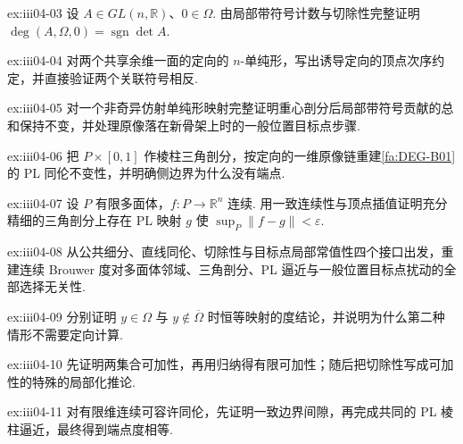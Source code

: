 \begin{FAExercise}[仿射度]{ex:iii04-03}
设 \(\displaystyle A\in GL(n,\mathbb R)\)、\(\displaystyle0\in\Omega\). 由局部带符号计数与切除性完整证明 \(\displaystyle\deg(A,\Omega,0)=\operatorname{sgn}\det A\).
\end{FAExercise}

\begin{FAExercise}[内部面的抵消]{ex:iii04-04}
对两个共享余维一面的定向的 \(\displaystyle n\)-单纯形，写出诱导定向的顶点次序约定，并直接验证两个关联符号相反.
\end{FAExercise}

\begin{FAExercise}[细分不变性]{ex:iii04-05}
对一个非奇异仿射单纯形映射完整证明重心剖分后局部带符号贡献的总和保持不变，并处理原像落在新骨架上时的一般位置目标点步骤.
\end{FAExercise}

\begin{FAExercise}[PL 同伦]{ex:iii04-06}
把 \(\displaystyle P\times[0,1]\) 作棱柱三角剖分，按定向的一维原像链重建\autoref{fa:DEG-B01}的 PL 同伦不变性，并明确侧边界为什么没有端点.
\end{FAExercise}

\begin{FAExercise}[连续 PL 逼近]{ex:iii04-07}
设 \(\displaystyle P\) 有限多面体，\(\displaystyle f:P\to\mathbb R^n\) 连续. 用一致连续性与顶点插值证明充分精细的三角剖分上存在 PL 映射 \(\displaystyle g\) 使 \(\displaystyle\sup_P\|f-g\|<\varepsilon\).
\end{FAExercise}

\begin{FAExercise}[度的良定义性]{ex:iii04-08}
从公共细分、直线同伦、切除性与目标点局部常值性四个接口出发，重建连续 Brouwer 度对多面体邻域、三角剖分、PL 逼近与一般位置目标点扰动的全部选择无关性.
\end{FAExercise}

\begin{FAExercise}[规范化]{ex:iii04-09}
分别证明 \(\displaystyle y\in\Omega\) 与 \(\displaystyle y\notin\overline\Omega\) 时恒等映射的度结论，并说明为什么第二种情形不需要定向计算.
\end{FAExercise}

\begin{FAExercise}[可加性与切除性]{ex:iii04-10}
先证明两集合可加性，再用归纳得有限可加性；随后把切除性写成可加性的特殊的局部化推论.
\end{FAExercise}

\begin{FAExercise}[同伦不变性]{ex:iii04-11}
对有限维连续可容许同伦，先证明一致边界间隙，再完成共同的 PL 棱柱逼近，最终得到端点度相等.
\end{FAExercise}

